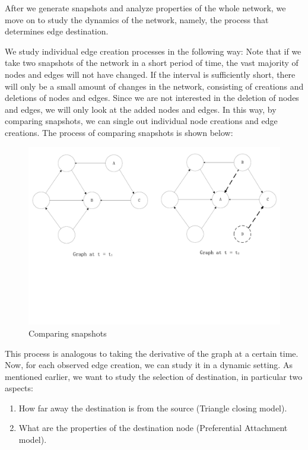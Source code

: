 \documentclass[10pt]{article}
\begin{document}
\begin{multicols}{2}
After we generate snapshots and analyze properties of the whole network, we move on to study the dynamics of the network, namely, the process that determines edge destination.

We study individual edge creation processes in the following way: Note that if we take two snapshots of the network in a short period of time, the vast majority of nodes and edges will not have changed. If the interval is sufficiently short, there will only be a small amount of changes in the network, consisting of creations and deletions of nodes and edges. Since we are not interested in the deletion of nodes and edges, we will only look at the added nodes and edges. In this way, by comparing snapshots, we can single out individual node creations and edge creations. The process of comparing snapshots is shown below:
\begin{figure}[H]
    \centering
        \includegraphics[scale = 0.25, trim = 0cm 8cm 0cm 0cm]{./dynamic.pdf}
    \caption{Comparing snapshots} \label{fig:compare}
\end{figure}


This process is analogous to taking the derivative of the graph at a certain time. Now, for each observed edge creation, we can study it in a dynamic setting. As mentioned earlier, we want to study the selection of destination, in particular two aspects:
\begin{enumerate}
\item How far away the destination is from the source (Triangle closing model).
\item What are the properties of the destination node (Preferential Attachment model).
\end{enumerate}


\end{multicols}
\end{document}

